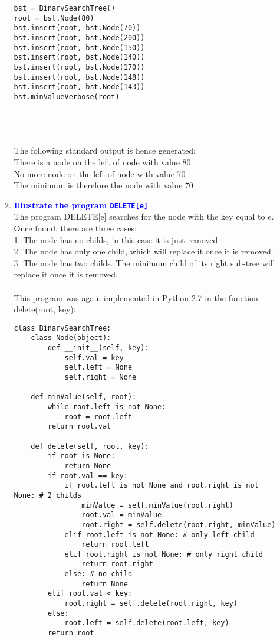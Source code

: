 \documentclass[11pt]{article}
\begin{document}
\begin{enumerate}
\begin{enumerate}
\begin{verbatim}
bst = BinarySearchTree()
root = bst.Node(80)
bst.insert(root, bst.Node(70))
bst.insert(root, bst.Node(200))
bst.insert(root, bst.Node(150))
bst.insert(root, bst.Node(140))
bst.insert(root, bst.Node(170))
bst.insert(root, bst.Node(148))
bst.insert(root, bst.Node(143))
bst.minValueVerbose(root)
        \end{verbatim}
        \\\\\\ The following standard output is hence generated:
        \\ There is a node on the left of node with value 80
        \\ No more node on the left of node with value 70
        \\ The minimum is therefore the node with value 70
        \\
    \item \textbf{\textcolor{blue}{Illustrate the program {\tt DELETE[e]}}}
        \\ The program DELETE[e] searches for the node with the key equal to $e$.
        \\ Once found, there are three cases:
        \\ 1. The node has no childs, in this case it is just removed.
        \\ 2. The node has only one child, which will replace it once it is removed.
        \\ 3. The node has two childs. The minimum child of its right sub-tree will replace it once it is removed.
        \\\\ This program was again implemented in Python 2.7 in the function delete(root, key):
        \begin{verbatim}
class BinarySearchTree:
    class Node(object):
        def __init__(self, key):
            self.val = key
            self.left = None
            self.right = None
        
    def minValue(self, root):
        while root.left is not None:
            root = root.left
        return root.val
        
    def delete(self, root, key):
        if root is None:
            return None
        if root.val == key:
            if root.left is not None and root.right is not None: # 2 childs
                minValue = self.minValue(root.right)
                root.val = minValue
                root.right = self.delete(root.right, minValue)                    
            elif root.left is not None: # only left child
                return root.left
            elif root.right is not None: # only right child
                return root.right
            else: # no child
                return None
        elif root.val < key:
            root.right = self.delete(root.right, key)
        else:
            root.left = self.delete(root.left, key)
        return root
        

\end{verbatim}
\end{enumerate}
\end{enumerate}
\end{document}
